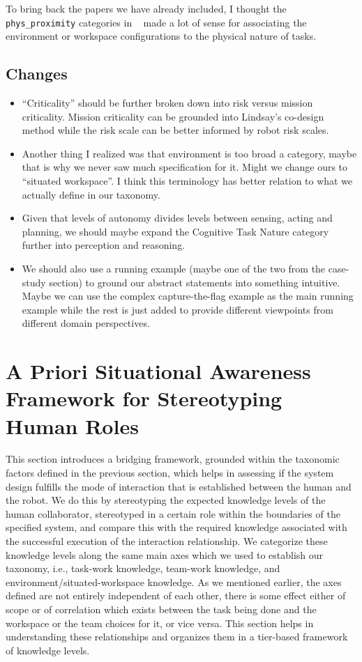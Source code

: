 \documentclass[letterpaper, 10 pt, conference]{ieeeconf} %
\theoremstyle{definition} \newtheorem{definition}{Definition}
\newcommand{\citet}[1]{\citeauthor{#1}~\cite{#1}}
\begin{document}
To bring back the papers we have already included, I thought the
\texttt{phys\_proximity} categories in \citet{Yanco2004updated} made a lot of
sense for associating the environment or workspace configurations to the
physical nature of tasks.

\subsection{Changes}
\begin{itemize}{}
  \item ``Criticality'' should be further broken down into risk versus mission
        criticality. Mission criticality can be grounded into Lindsay's co-design
        method while the risk scale can be better informed by robot risk scales.
  \item Another thing I realized was that environment is too broad a category,
        maybe that is why we never saw much specification for it. Might we change
        ours to ``situated workspace''. I think this terminology has better relation
        to what we actually define in our taxonomy.
  \item Given that levels of autonomy divides levels between sensing, acting and
        planning, we should maybe expand the Cognitive Task Nature category further
        into perception and reasoning.
  \item We should also use a running example (maybe one of the two from the
        case-study section) to ground our abstract statements into something
        intuitive. Maybe we can use the complex capture-the-flag example as the main
        running example while the rest is just added to provide different viewpoints
        from different domain perspectives.
\end{itemize}

\section{A Priori Situational Awareness Framework for Stereotyping Human Roles}

This section introduces a bridging framework, grounded within the taxonomic
factors defined in the previous section, which helps in assessing if the system
design fulfills the mode of interaction that is established between the human
and the robot. We do this by stereotyping the expected knowledge levels of the
human collaborator, stereotyped in a certain role within the boundaries of the
specified system, and compare this with the required knowledge associated with
the successful execution of the interaction relationship. We categorize these
knowledge levels along the same main axes which we used to establish our
taxonomy, i.e., task-work knowledge, team-work knowledge, and
environment/situated-workspace knowledge. As we mentioned earlier, the axes
defined are not entirely independent of each other, there is some effect either
of scope or of correlation which exists between the task being done and the
workspace or the team choices for it, or vice versa. This section helps in
understanding these relationships and organizes them in a tier-based framework
of knowledge levels.
\end{document}
